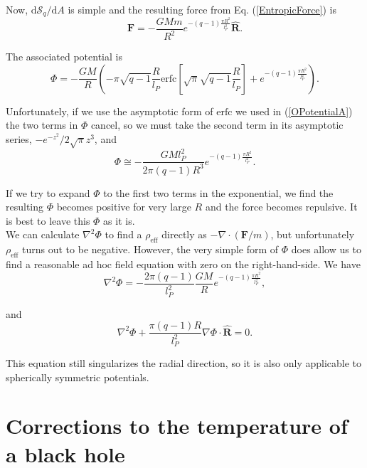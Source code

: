 \documentclass[nofootinbib,aps,prd,preprint,groupedaddress,showpacs,showkeys]{revtex4-1}
\newcommand{\dif}{\mathrm{d}}
\begin{document}
\noindent Now, $\dif \mathcal{S}_q / \dif A$ is simple and the resulting force from Eq. (\ref{EntropicForce}) is
\begin{equation}
\mathbf{F} = -\frac{GMm}{R^2} e^{-(q-1) \frac{\pi R^2}{l_P^2}} \hat{\mathbf{R}}.
\end{equation}

\noindent The associated potential is
\begin{equation}
\Phi = -\frac{GM}{R} \left( -\pi \sqrt{q-1} \frac{R}{l_P} \mathrm{erfc}\left[\sqrt{\pi} \sqrt{q-1}\frac{R}{l_P}\right] + e^{-(q-1) \frac{\pi R^2}{l_P^2}} \right).
\end{equation}

\noindent Unfortunately, if we use the asymptotic form of $\mathrm{erfc}$ we used in (\ref{OPotentialA}) the two terms in $\Phi$ cancel, so we must take the second term in its asymptotic series, $-e^{-z^2}/2\sqrt{\pi} z^3$, and
\begin{equation}
\Phi \cong - \frac{GMl_P^2}{2\pi (q-1) R^3} e^{-(q-1)\frac{\pi R^2}{l_P^2}}. \label{TsallisApprox}
\end{equation}

\noindent If we try to expand $\Phi$ to the first two terms in the exponential, we find the resulting $\Phi$ becomes positive for very large $R$ and the force becomes repulsive. It is best to leave this $\Phi$ as it is.\\
\indent We can calculate $\nabla^2 \Phi$ to find a $\rho_{\mathrm{eff}}$ directly as $-\nabla \cdot (\mathbf{F}/m)$, but unfortunately $\rho_{\mathrm{eff}}$ turns out to be negative. However, the very simple form of $\Phi$ does allow us to find a reasonable ad hoc field equation with zero on the right-hand-side. We have
\begin{equation}
\nabla^2 \Phi = -\frac{2\pi (q-1)}{l_P^2} \frac{GM}{R} e^{-(q-1) \frac{\pi R^2}{l_P^2}},
\end{equation}

\noindent and
\begin{equation}
\nabla^2 \Phi + \frac{\pi (q-1) R}{l_P^2} \nabla \Phi \cdot \hat{\mathbf{R}} = 0. \label{laplacian2}
\end{equation}

\noindent This equation still singularizes the radial direction, so it is also only applicable to spherically symmetric potentials.

\section{Corrections to the temperature of a black hole}
\end{document}
